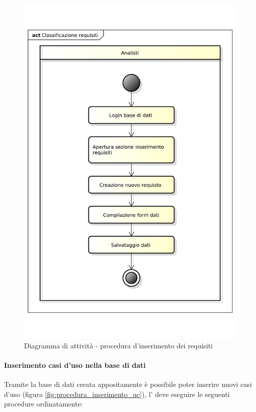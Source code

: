 			 	\begin{figure}
					\centering
					\includegraphics[scale=0.4]{images/classificazione_requisiti.pdf}
					\caption{Diagramma di attività - procedura d'inserimento dei requisiti}
					\label{fig:procedura_inserimento_requisiti}
				\end{figure}

			\paragraph{Inserimento casi d'uso nella base di dati}
			Tramite la base di dati creata appositamente è possibile poter inserire nuovi casi d'uso (figura \ref{fig:procedura_inserimento_uc}), l'\roleAnalyst{} deve eseguire le seguenti procedure ordinatamente:

